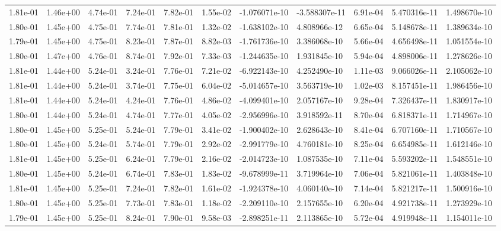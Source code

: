 \begin{longtable}{| p{} | p{} |}
1.81e-01 & 1.46e+00 & 4.74e-01 & 7.24e-01 & 7.82e-01 & 1.55e-02 & -1.076071e-10 & -3.588307e-11 &  6.91e-04 &  5.470316e-11 &  1.498670e-10 \\
1.80e-01 & 1.45e+00 & 4.75e-01 & 7.74e-01 & 7.81e-01 & 1.32e-02 & -1.638102e-10 &  4.808966e-12 &  6.65e-04 &  5.148678e-11 &  1.389634e-10 \\
1.79e-01 & 1.45e+00 & 4.75e-01 & 8.23e-01 & 7.87e-01 & 8.82e-03 & -1.761736e-10 &  3.386068e-10 &  5.66e-04 &  4.656498e-11 &  1.051554e-10 \\
1.80e-01 & 1.47e+00 & 4.76e-01 & 8.74e-01 & 7.92e-01 & 7.33e-03 & -1.244635e-10 &  1.931845e-10 &  5.94e-04 &  4.898006e-11 &  1.278626e-10 \\
1.81e-01 & 1.44e+00 & 5.24e-01 & 3.24e-01 & 7.76e-01 & 7.21e-02 & -6.922143e-10 &  4.252490e-10 &  1.11e-03 &  9.066026e-11 &  2.105062e-10 \\
1.81e-01 & 1.44e+00 & 5.24e-01 & 3.74e-01 & 7.75e-01 & 6.04e-02 & -5.014657e-10 &  3.563719e-10 &  1.02e-03 &  8.157451e-11 &  1.986456e-10 \\
1.81e-01 & 1.44e+00 & 5.24e-01 & 4.24e-01 & 7.76e-01 & 4.86e-02 & -4.099401e-10 &  2.057167e-10 &  9.28e-04 &  7.326437e-11 &  1.830917e-10 \\
1.80e-01 & 1.44e+00 & 5.24e-01 & 4.74e-01 & 7.77e-01 & 4.05e-02 & -2.956996e-10 &  3.918592e-11 &  8.70e-04 &  6.818371e-11 &  1.714967e-10 \\
1.80e-01 & 1.45e+00 & 5.25e-01 & 5.24e-01 & 7.79e-01 & 3.41e-02 & -1.900402e-10 &  2.628643e-10 &  8.41e-04 &  6.707160e-11 &  1.710567e-10 \\
1.80e-01 & 1.45e+00 & 5.24e-01 & 5.74e-01 & 7.79e-01 & 2.92e-02 & -2.991779e-10 &  4.760181e-10 &  8.25e-04 &  6.654985e-11 &  1.612146e-10 \\
1.81e-01 & 1.45e+00 & 5.25e-01 & 6.24e-01 & 7.79e-01 & 2.16e-02 & -2.014723e-10 &  1.087535e-10 &  7.11e-04 &  5.593202e-11 &  1.548551e-10 \\
1.80e-01 & 1.45e+00 & 5.24e-01 & 6.74e-01 & 7.83e-01 & 1.83e-02 & -9.678999e-11 &  3.719964e-10 &  7.06e-04 &  5.821061e-11 &  1.403848e-10 \\
1.81e-01 & 1.45e+00 & 5.25e-01 & 7.24e-01 & 7.82e-01 & 1.61e-02 & -1.924378e-10 &  4.060140e-10 &  7.14e-04 &  5.821217e-11 &  1.500916e-10 \\
1.80e-01 & 1.45e+00 & 5.25e-01 & 7.73e-01 & 7.83e-01 & 1.18e-02 & -2.209110e-10 &  2.157655e-10 &  6.20e-04 &  4.921738e-11 &  1.273929e-10 \\
1.79e-01 & 1.45e+00 & 5.25e-01 & 8.24e-01 & 7.90e-01 & 9.58e-03 & -2.898251e-11 &  2.113865e-10 &  5.72e-04 &  4.919948e-11 &  1.154011e-10 \\

\end{longtable}
